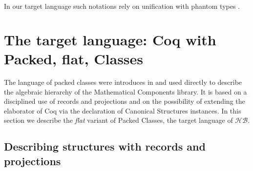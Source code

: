 \documentclass[a4paper,UKenglish,cleveref, autoref]{lipics-v2019}
\newcommand{\HB}{\ensuremath{\mathcal{HB}}}
\newcommand{\C}{\ensuremath{\mathcal{C}}}
\newcommand{\class}{class}
\newcommand{\cdef}{\ensuremath{\mathit{def}}}
\newcommand{\subclass}{subclass}
\newcommand{\join}{\ensuremath{\mathit{join}}}
\theoremstyle{implem}
\theoremstyle{implem}
\theoremstyle{command}
\begin{document}
In our target language such notations rely on unification with
phantom types \cite{DBLP:conf/itp/MahboubiT13}.








\section{The target language: Coq with Packed, flat, Classes}
\label{sec:target-lang}

The language of packed classes were introduces in
\cite{DBLP:conf/tphol/GarillotGMR09} and used directly to describe the
algebraic hierarchy of the Mathematical Components library.
It is based on a disciplined use of records and projections and
on the possibility of extending the elaborator of Coq
via the declaration of Canonical Structures instances.
In this section we describe the \emph{flat} variant of
Packed Classes, the target language of \HB{}.

\subsection{Describing structures with records and projections}
\end{document}
